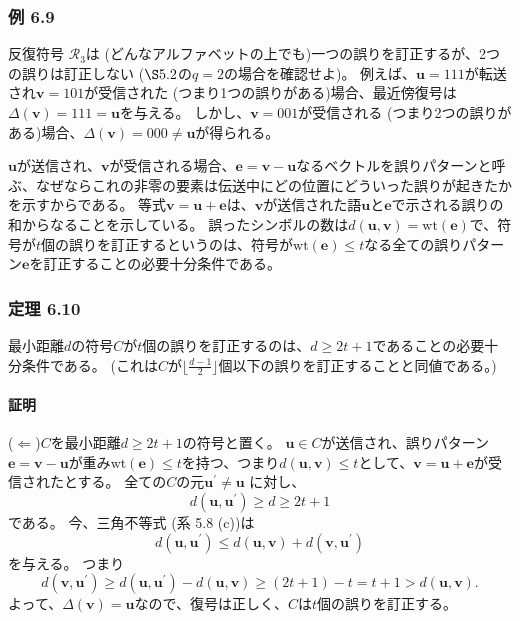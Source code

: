 \documentclass[12pt,a4paper]{article}
\begin{document}
\subsubsection*{例 6.9}

反復符号 $\mathcal{R}_3$は (どんなアルファベットの上でも)一つの誤りを訂正するが、2つの誤りは訂正しない ($\S 5.2$の$q=2$の場合を確認せよ)。
例えば、$\mathbf{u} = 111$が転送され$\mathbf{v} = 101$が受信された (つまり1つの誤りがある)場合、最近傍復号は$\Delta (\mathbf{v}) = 111 = \mathbf{u}$を与える。
しかし、$\mathbf{v} = 001$が受信される (つまり2つの誤りがある)場合、$\Delta (\mathbf{v}) = 000 \neq \mathbf{u}$が得られる。

$\mathbf{u}$が送信され、$\mathbf{v}$が受信される場合、$\mathbf{e} = \mathbf{v} - \mathbf{u}$なるベクトルを誤りパターンと呼ぶ、なぜならこれの非零の要素は伝送中にどの位置にどういった誤りが起きたかを示すからである。
等式$\mathbf{v} = \mathbf{u} + \mathbf{e}$は、$\mathbf{v}$が送信された語$\mathbf{u}$と$\mathbf{e}$で示される誤りの和からなることを示している。
誤ったシンボルの数は$d(\mathbf{u}, \mathbf{v}) = \text{wt} (\mathbf{e})$で、符号が$t$個の誤りを訂正するというのは、符号が$\text{wt} (\mathbf{e}) \leq t$なる全ての誤りパターン$\mathbf{e}$を訂正することの必要十分条件である。

\subsubsection*{定理 6.10}

最小距離$d$の符号$C$が$t$個の誤りを訂正するのは、$d \geq 2t + 1 $であることの必要十分条件である。
(これは$C$が$\lfloor \frac{d-1}{2} \rfloor$個以下の誤りを訂正することと同値である。)

\paragraph{証明}

($\Leftarrow$)$C$を最小距離$d \geq 2t + 1$の符号と置く。
$\mathbf{u} \in C$が送信され、誤りパターン$\mathbf{e} = \mathbf{v} - \mathbf{u}$が重み$\text{wt} (\mathbf{e}) \leq t$を持つ、つまり$d(\mathbf{u}, \mathbf{v}) \leq t$として、$\mathbf{v} = \mathbf{u} + \mathbf{e}$が受信されたとする。
全ての$C$の元$\mathbf{u}^\prime \neq \mathbf{u}$ に対し、
$$
d(\mathbf{u}, \mathbf{u}^\prime) \geq d \geq 2t + 1
$$
である。
今、三角不等式 (系 5.8 (c))は
$$
d(\mathbf{u}, \mathbf{u}^\prime) \leq d(\mathbf{u}, \mathbf{v}) + d(\mathbf{v}, \mathbf{u}^\prime)
$$
を与える。
つまり
$$
d(\mathbf{v}, \mathbf{u}^\prime) \geq d(\mathbf{u}, \mathbf{u}^\prime) - d(\mathbf{u}, \mathbf{v}) \geq (2t + 1) - t = t + 1 > d(\mathbf{u}, \mathbf{v}).
$$
よって、$\Delta (\mathbf{v}) = \mathbf{u}$なので、復号は正しく、$C$は$t$個の誤りを訂正する。
\end{document}
